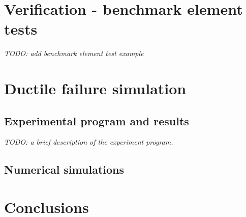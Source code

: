 \documentclass[11pt]{article}
\theoremstyle{remark}
\begin{document}
\section{Verification - benchmark element tests} \label{sec:verification}
\textit{TODO: add benchmark element test example}


\section{Ductile failure simulation} \label{sec:ductile}

\subsection{Experimental program and results}
\textit{TODO: a brief description of the experiment program.}



\subsection{Numerical simulations}



\section{Conclusions} \label{sec:conclusions}





\end{document}
